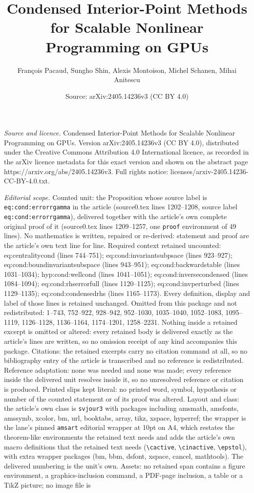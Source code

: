 \documentclass[10pt,a4paper]{amsart}
\title[Condensed Interior-Point Methods for Scalable Nonlinear Prog]{Condensed Interior-Point Methods for Scalable Nonlinear Programming on GPUs}
\author{Fran\c{c}ois Pacaud, Sungho Shin, Alexis Montoison, Michel Schanen, Mihai Anitescu}
\date{Source: arXiv:2405.14236v3 (CC BY 4.0)}
\begin{document}
\maketitle

\noindent\emph{Source and licence.} Condensed Interior-Point Methods for Scalable Nonlinear Programming on GPUs. Version arXiv:2405.14236v3 (CC BY 4.0), distributed under the Creative Commons Attribution 4.0 International licence, as recorded in the arXiv licence metadata for this exact version and shown on the abstract page https://arxiv.org/abs/2405.14236v3. Full rights notice: licenses/arxiv-2405.14236-CC-BY-4.0.txt.\par\smallskip

\noindent\textit{Editorial scope.} Counted unit: the Proposition whose source label is \texttt{eq:cond:errorrgamma} in the article (source0.tex lines 1202--1208, source label \texttt{eq:cond:errorrgamma}), delivered together with the article's own complete original proof of it (source0.tex lines 1209--1257, one \texttt{proof} environment of 49 lines). No mathematics is written, repaired or re-derived: statement and proof are the article's own text line for line. Required context retained uncounted: eq:centralitycond (lines 744--751); eq:cond:invariantsubpsace (lines 923--927); eq:cond:boundinvariantsubspace (lines 943--951); eq:cond:backwardstable (lines 1031--1034); hyp:cond:wellcond (lines 1041--1051); eq:cond:inversecondensed (lines 1084--1094); eq:cond:rhserrorfull (lines 1120--1125); eq:cond:invperturbed (lines 1129--1135); eq:cond:condensedrhs (lines 1165--1173). Every definition, display and label of those lines is retained unchanged. Omitted from this package and not redistributed: 1--743, 752--922, 928--942, 952--1030, 1035--1040, 1052--1083, 1095--1119, 1126--1128, 1136--1164, 1174--1201, 1258--2231. Nothing inside a retained excerpt is omitted or altered: every retained body is delivered exactly as the article's lines are written, so no omission receipt of any kind accompanies this package. Citations: the retained excerpts carry no citation command at all, so no bibliography entry of the article is transcribed and no reference is redistributed. Reference adaptation: none was needed and none was made; every reference inside the delivered unit resolves inside it, so no unresolved reference or citation is produced. Printed slips kept literal: no printed word, symbol, hypothesis or number of the counted statement or of its proof was altered. Layout and class: the article's own class is \texttt{svjour3} with packages including amsmath, amsfonts, amssymb, xcolor, bm, url, booktabs, array, tikz, xspace, hyperref; the wrapper is the lane's pinned \texttt{amsart} editorial wrapper at 10pt on A4, which restates the theorem-like environments the retained text needs and adds the article's own macro definitions that the retained text needs (\texttt{\textbackslash cactive}, \texttt{\textbackslash cinactive}, \texttt{\textbackslash epstol}), with extra wrapper packages (bm, bbm, dsfont, xspace, cancel, mathtools). The delivered numbering is the unit's own. Assets: no retained span contains a figure environment, a graphics-inclusion command, a PDF-page inclusion, a table or a TikZ picture; no image file is 
\end{document}
